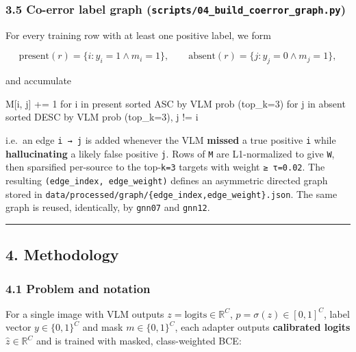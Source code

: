 \documentclass[
  11pt,
]{article}
\newenvironment{Shaded}{}{}
\newcommand{\NormalTok}[1]{#1}
\begin{document}
\subsubsection{\texorpdfstring{3.5 Co-error label graph
(\texttt{scripts/04\_build\_coerror\_graph.py})}{3.5 Co-error label graph (scripts/04\_build\_coerror\_graph.py)}}\label{co-error-label-graph-scripts04_build_coerror_graph.py}

For every training row with at least one positive label, we form

\[\text{present}(r)=\{i:y_i=1\wedge m_i=1\},\qquad
\text{absent}(r)=\{j:y_j=0\wedge m_j=1\},\]

and accumulate

\begin{Shaded}
\begin{Highlighting}[]
\NormalTok{M[i, j] += 1   for i in present sorted ASC by VLM prob (top\_k=3)}
\NormalTok{                for j in absent  sorted DESC by VLM prob (top\_k=3), j != i}
\end{Highlighting}
\end{Shaded}

i.e.~an edge \texttt{i\ →\ j} is added whenever the VLM \textbf{missed}
a true positive \texttt{i} while \textbf{hallucinating} a likely false
positive \texttt{j}. Rows of \texttt{M} are L1-normalized to give
\texttt{W}, then sparsified per-source to the top-\texttt{k=3} targets
with weight \texttt{≥\ τ=0.02}. The resulting
\texttt{(edge\_index,\ edge\_weight)} defines an asymmetric directed
graph stored in
\texttt{data/processed/graph/\{edge\_index,edge\_weight\}.json}. The
same graph is reused, identically, by \texttt{gnn07} and \texttt{gnn12}.

\begin{center}\rule{0.5\linewidth}{0.5pt}\end{center}

\subsection{4. Methodology}\label{methodology}

\subsubsection{4.1 Problem and notation}\label{problem-and-notation}

For a single image with VLM outputs \(z=\text{logits}\in\mathbb{R}^C\),
\(p=\sigma(z)\in[0,1]^C\), label vector \(y\in\{0,1\}^C\) and mask
\(m\in\{0,1\}^C\), each adapter outputs \textbf{calibrated logits}
\(\hat z\in\mathbb{R}^C\) and is trained with masked, class-weighted
BCE:
\end{document}
